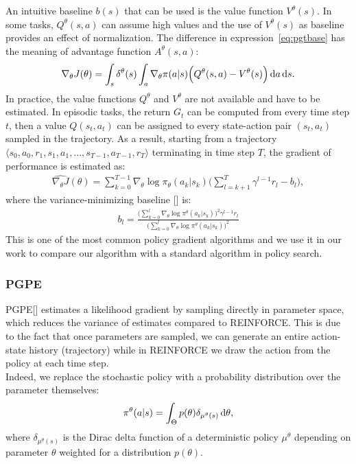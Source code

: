 An intuitive baseline $b(s)$ that can be used is the value function $V^{\theta}(s)$. In some tasks, $Q^{\theta}(s,a)$ can assume high values and the use of $V^{\theta}(s)$ as baseline provides an effect of normalization. The difference in expression~\eqref{eq:pgtbase} has the meaning of advantage function $A^{\theta}(s,a)$:
\begin{align} \nabla_{\theta}J(\theta) = \int_s \delta^{\theta}(s) \int_a \nabla_{\theta} \pi(a|s) \Big( Q^{\theta}(s,a) - V^{\theta}(s) \Big) \,\mathrm{d} a \,\mathrm{d} s.\end{align}
In practice, the value functions $Q^{\theta}$ and $V^{\theta}$ are not available and have to be estimated. In episodic tasks, the return $G_t$ can be computed from every time step $t$, then a value $Q(s_t, a_t)$ can be assigned to every state-action pair $(s_t, a_t)$ sampled in the trajectory. As a result, starting from a trajectory $\langle s_0, a_0, r_1, s_1, a_1, ..., s_{T-1}, a_{T-1}, r_{T} \rangle$ terminating in time step $T$, the gradient of performance is estimated as:
\begin{align}
\widehat{\nabla_{\theta}J}(\theta) = \sum_{k=0}^{T-1} \nabla_{\theta}\log\pi_{\theta}(a_k|s_k)\Big(\sum_{l=k+1}^{T}\gamma^{l-1}r_{l} - b_{l} \Big),
\end{align}
where the variance-minimizing baseline [\cite{Peters2008ReinforcementLO}] is:
\begin{align} b_l = \frac{\Big( \sum_{k=0}^{l}\nabla_{\theta} \log\pi^{\theta}(a_k|s_k)\Big)^2 \gamma^{l-1}r_l} {\Big( \sum_{k=0}^{l}\nabla_{\theta} \log\pi^{\theta}(a_k|s_k)\Big)^2}
\end{align}
This is one of the most common policy gradient algorithms and we use it in our work to compare our algorithm with a standard algorithm in policy search.

\subsubsection{PGPE} \label{subsec:pgpe}
\acf{PGPE}[\citet{sehnke2008PolicyGradient}] estimates a likelihood gradient by sampling directly in parameter space, which reduces the variance of estimates compared to REINFORCE. This is due to the fact that once parameters are sampled, we can generate an entire action-state history (trajectory) while in REINFORCE we draw the action from the policy at each time step.\\
\newline
Indeed, we replace the stochastic policy with a probability distribution over the parameter themselves:
$$ \pi^{\theta}(a|s) = \int_{\Theta} p(\theta) \delta_{\mu^{\theta}(s)}\,\mathrm{d} \theta,
$$
where $\delta_{\mu^{\theta}(s)}$ is the Dirac delta function of a deterministic policy $\mu^{\theta}$ depending on parameter $\theta$ weighted for a distribution $p(\theta)$.

